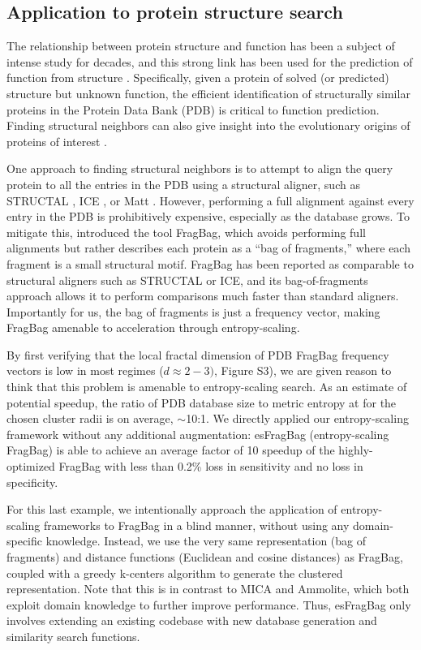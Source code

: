 \documentclass[11pt]{elsarticle}
\renewcommand{\cite}{\citep} %
\theoremstyle{definition}
\theoremstyle{remark}
\numberwithin{equation}{section}
\begin{document}
\subsection{Application to protein structure search}

The relationship between protein structure and function has been a subject of intense study for decades,
and this strong link has been used for the prediction of function from structure \cite{hegyi1999relationship}.
Specifically, given a protein of solved (or predicted) structure but unknown function, the efficient identification
of structurally similar proteins in the Protein Data Bank (PDB) is critical to function prediction.
Finding structural neighbors can also give insight into the evolutionary origins of proteins of interest \cite{yona1999protomap,nepomnyachiy2014global}.

One approach to finding structural neighbors is to attempt to align the query protein to all the entries in the PDB using a structural aligner, such as 
STRUCTAL \cite{subbiah1993structural}, ICE \cite{shindyalov1998protein}, or 
Matt \cite{menke2008matt}.
However, performing a full alignment against every entry in the PDB is prohibitively expensive, especially as the database grows.
To mitigate this, \citep{budowski2010fragbag} introduced the tool FragBag, which avoids performing full alignments but rather describes each protein as a
``bag of fragments,'' where each fragment is a small structural motif.
FragBag has been reported as comparable to structural aligners such as STRUCTAL or ICE,
and its bag-of-fragments approach
allows it to perform comparisons much faster than standard aligners.
Importantly for us, the bag of fragments is just a frequency vector, making
FragBag amenable to acceleration through entropy-scaling.

By first verifying that the local fractal dimension of PDB FragBag frequency vectors is low in most regimes ($d \approx 2-3)$, Figure S3), we are given reason to think that this problem is amenable to entropy-scaling search.
As an estimate of potential speedup, the ratio of PDB database size to metric 
entropy at for the chosen cluster radii is on average, $\sim$10:1.
We directly applied our entropy-scaling framework without any additional 
augmentation: esFragBag (entropy-scaling FragBag) is able to achieve an average
factor of 10 speedup of the highly-optimized FragBag with less than 0.2\% loss 
in sensitivity and no loss in specificity.

For this last example, we intentionally approach the application of entropy-scaling frameworks to FragBag in a blind manner,
without using any domain-specific knowledge.
Instead, we use the very same representation (bag of fragments) and distance functions (Euclidean and cosine distances)
as FragBag, coupled with a greedy k-centers algorithm to generate the clustered representation.
Note that this is in contrast to MICA and Ammolite, which both exploit domain knowledge to further improve performance.
Thus, esFragBag only involves extending an existing codebase with new database generation and similarity search functions.
\end{document}
